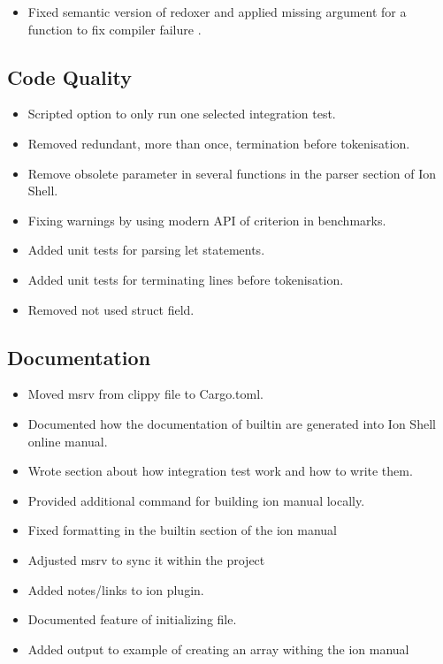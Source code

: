 \begin{itemize}
	\item Fixed semantic version of \gls{redoxer} and applied missing argument for a function to fix compiler failure \cite{pr_bump_fix_redoxer}.
\end{itemize}

\subsection{Code Quality}

\begin{itemize}
	\item Scripted option to only run one selected integration test. \cite{pr_single_test_selectable}
	\item Removed redundant, more than once, termination before tokenisation. \cite{pr_removed_redundant_termination}
	\item Remove obsolete parameter in several functions in the parser section of Ion Shell. \cite{pr_remove_not_needed_parameter}
	\item Fixing warnings by using modern API of criterion in benchmarks. \cite{pr_fix_warnings_deprecated_criterion_api}
	\item Added unit tests for parsing let statements. \cite{pr_added_unit_test_let_grammar}
	\item Added unit tests for terminating lines before tokenisation. \cite{pr_test_terminator_todos}
	\item Removed not used struct field. \cite{pr_removed_flag_undead_code}
\end{itemize}

\subsection{Documentation}

\begin{itemize}
	\item Moved msrv from clippy file to Cargo.toml. \cite{pr_moved_msrv_to_cargo}
	\item Documented how the documentation of builtin are generated into Ion Shell online manual. \cite{pr_docs_how_builtin_generated}
	\item Wrote section about how integration test work and how to write them. \cite{pr_docs_section_integraion_test}
	\item Provided additional command for building ion manual locally. \cite{pr_docs_commands_building_ion_manual}
	\item Fixed formatting in the builtin section of the ion manual \cite{pr_docs_fix_wrong_builtin_manual_section}
	\item Adjusted msrv to sync it within the project \cite{pr_docs_adjust_msrv_project}
	\item Added notes/links to ion plugin. \cite{pr_docs_ion_plugin}
	\item Documented feature of initializing file. \cite{pr_docs_init_file}
	\item Added output to example of creating an array withing the ion manual \cite{pr_docs_output_create_array}
\end{itemize}

